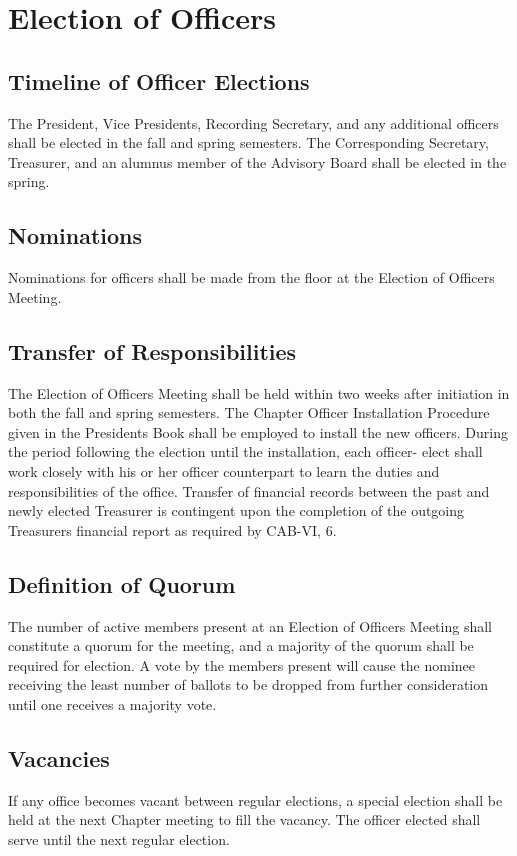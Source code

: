 \documentclass{article}
\begin{document}
	\section {Election of Officers}
	\subsection{Timeline of Officer Elections}
	The President, Vice Presidents, Recording Secretary, and any additional officers shall be elected in the fall and spring semesters. The Corresponding Secretary, Treasurer, and an alumnus member of the Advisory Board shall be elected in the spring.
	
	\subsection{Nominations}
	Nominations for officers shall be made from the floor at the Election of Officers Meeting.
	
	\subsection{Transfer of Responsibilities}
	The Election of Officers Meeting shall be held within two weeks after initiation in both the fall and spring semesters. The Chapter Officer Installation Procedure given in the President\textquotesingle s Book shall be employed to install the new officers. During the period following the election until the installation, each officer- elect shall work closely with his or her officer counterpart to learn the duties and responsibilities of the office. Transfer of financial records between the past and newly elected Treasurer is contingent upon the completion of the outgoing Treasurer\textquotesingle s financial report as required by CAB-VI, 6.
	
	\subsection{Definition of Quorum}
	The number of active members present at an Election of Officers Meeting shall constitute a quorum for the meeting, and a majority of the quorum shall be required for election. A vote by the members present will cause the nominee receiving the least number of ballots to be dropped from further consideration until one receives a majority vote.
	
	\subsection{Vacancies}
	If any office becomes vacant between regular elections, a special election shall be held at the next Chapter meeting to fill the vacancy. The officer elected shall serve until the next regular election.
	
\end{document}

